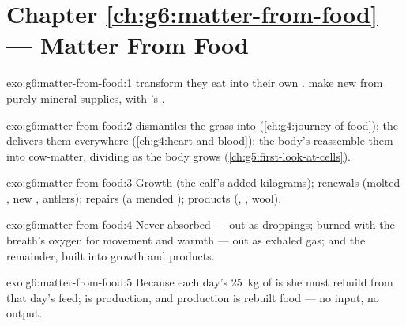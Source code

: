 \section*{Chapter \ref{ch:g6:matter-from-food} --- Matter From Food}

\begin{solution}{exo:g6:matter-from-food:1}
 transform  they eat into their own
.  make new  from
purely mineral supplies, with 's .
\end{solution}

\begin{solution}{exo:g6:matter-from-food:2}
 dismantles the grass into 
(\cref{ch:g4:journey-of-food}); the  delivers them
everywhere (\cref{ch:g4:heart-and-blood}); the body's 
reassemble them into cow-matter, dividing as the body grows
(\cref{ch:g5:first-look-at-cells}).
\end{solution}

\begin{solution}{exo:g6:matter-from-food:3}
Growth (the calf's added kilograms); renewals (molted ,
new , antlers); repairs (a mended ); products
(, , wool).
\end{solution}

\begin{solution}{exo:g6:matter-from-food:4}
Never absorbed --- out as droppings; burned with the
breath's oxygen for movement and warmth --- out as exhaled
gas; and the remainder, built into growth and products.
\end{solution}

\begin{solution}{exo:g6:matter-from-food:5}
Because each day's \qty{25}{kg} of  is 
she must rebuild from that day's feed;  is production,
and production is rebuilt food --- no input, no output.
\end{solution}

